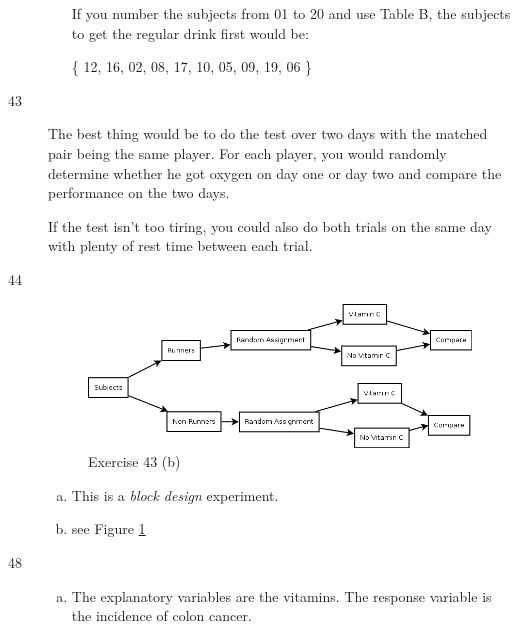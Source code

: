 \documentclass[letterpaper, landscape]{exam}
\begin{document}
\begin{description}
\begin{enumerate}[(a)]
            If you number the subjects from 01 to 20 and use Table B, the
            subjects to get the regular drink first would be:

            \{ 12, 16, 02, 08, 17, 10, 05, 09, 19, 06 \}

        \end{enumerate}

      \item[43]
        The best thing would be to do the test over two days with the matched
        pair being the same player.  For each player, you would randomly
        determine whether he got oxygen on day one or day two and compare the
        performance on the two days.

        If the test isn't too tiring, you could also do both trials on the same
        day with plenty of rest time between each trial.


      \item[44]
        \begin{figure}[H]
          \centering
          \includegraphics[scale = 0.3]{ex43.png}
          \caption{Exercise 43 (b)}
          \label{fig:ex43}
        \end{figure}
        \begin{enumerate}[(a)]
          \item This is a {\em block design} experiment.

          \item see Figure \ref{fig:ex43}
        \end{enumerate}

      \item[48] 
        \begin{enumerate}[(a)]
          \item The explanatory variables are the vitamins.  The response
            variable is the incidence of colon cancer.


\end{enumerate}
\end{description}
\end{document}
